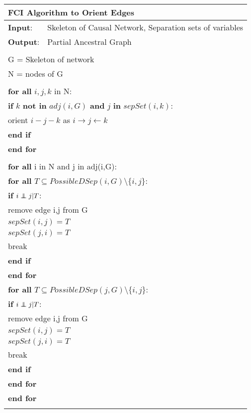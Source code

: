 \documentclass{article}
\newcommand\independent{\protect\mathpalette{\protect\independenT}{\perp}}
\def\independenT#1#2{\mathrel{\rlap{$#1#2$}\mkern2mu{#1#2}}}
\begin{document}
\begin{longtable}{|l l|}
	\hline
	\multicolumn{2}{|l|}{FCI Algorithm to Orient Edges}\\ 
	\hline
	\textbf{Input}: & Skeleton of Causal Network, Separation sets of variables\\
	\textbf{Output}: & Partial Ancestral Graph\\
	&\\
	\multicolumn{2}{|l|}{G = Skeleton of network}\\
	\multicolumn{2}{|l|}{N = nodes of G}\\
	&\\
	\multicolumn{2}{|l|}{\textbf{for all} $ i,j,k $ in N:}\\
	\multicolumn{2}{|l|}{\quad\textbf{if} $ k $ \textbf{not in} $ adj(i,G) $ \textbf{and} $ j $ \textbf{in} $sepSet( i,k)$:}\\
	\multicolumn{2}{|l|}{\quad\quad orient $ i-j-k $ as $ i\rightarrow j \leftarrow k $ }\\
	\multicolumn{2}{|l|}{\quad\textbf{end if}}\\
	\multicolumn{2}{|l|}{\textbf{end for}}\\
	&\\
	
	\multicolumn{2}{|l|}{\textbf{for all} i in N and j in adj(i,G):}\\
	\multicolumn{2}{|l|}{\quad \textbf{for all} $T \subseteq PossibleDSep(i,G)\setminus \{i,j\}$:}\\
	\multicolumn{2}{|l|}{\quad\quad \textbf{if} $i \independent j | T$:}\\
	\multicolumn{2}{|l|}{\quad\quad \quad remove edge i,j from G}\\
	\multicolumn{2}{|l|}{\quad\quad \quad $sepSet(i,j) = T$}\\	
	\multicolumn{2}{|l|}{\quad\quad \quad $sepSet(j,i) = T$}\\
	\multicolumn{2}{|l|}{\quad\quad \quad break}\\
	\multicolumn{2}{|l|}{\quad\quad\textbf{end if}}\\
	\multicolumn{2}{|l|}{\quad\textbf{end for}}\\
	\multicolumn{2}{|l|}{\quad \textbf{for all} $T \subseteq PossibleDSep(j,G)\setminus \{i,j\}$:}\\
	\multicolumn{2}{|l|}{\quad\quad \textbf{if} $i \independent j | T$:}\\
	\multicolumn{2}{|l|}{\quad\quad \quad remove edge i,j from G}\\
	\multicolumn{2}{|l|}{\quad\quad \quad $sepSet(i,j) = T$}\\	
	\multicolumn{2}{|l|}{\quad\quad \quad $sepSet(j,i) = T$}\\
	\multicolumn{2}{|l|}{\quad\quad \quad break}\\
	\multicolumn{2}{|l|}{\quad\quad\textbf{end if}}\\
	\multicolumn{2}{|l|}{\quad\textbf{end for}}\\
	\multicolumn{2}{|l|}{\textbf{end for}}\\	
	&\\
	

\end{longtable}
\end{document}
